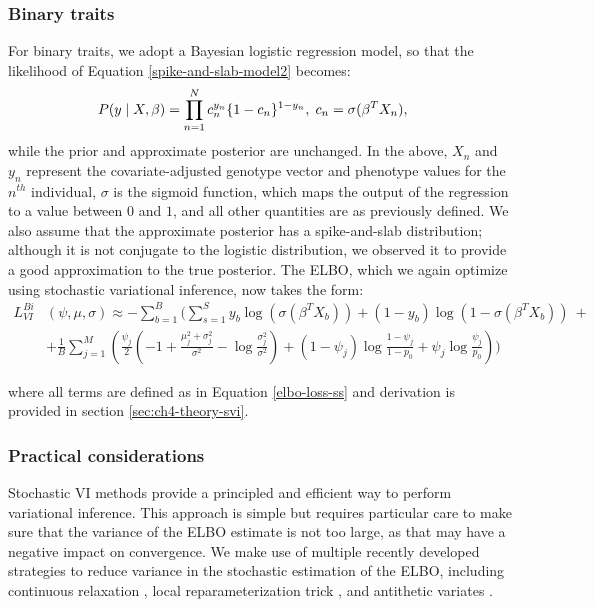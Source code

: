 \subsubsection{Binary traits}
%
For binary traits, we adopt a Bayesian logistic regression model, so that the likelihood of Equation \ref{spike-and-slab-model2} becomes:
\begin{align}
    P(y \mid X, \beta) &= \prod_{n=1}^{N} c_n^{y_n} \{1 - c_n\}^{1-y_n}, \hspace{1mm} c_n = \sigma(\beta^T X_n),
    \label{spike-and-slab-model3}
\end{align}
while the prior and approximate posterior are unchanged.
%
In the above, $X_n$ and $y_n$ represent the covariate-adjusted genotype vector and phenotype values for the $n^{th}$ individual, $\sigma$ is the sigmoid function, which maps the output of the regression to a value between $0$ and $1$, and all other quantities are as previously defined.
%
We also assume that the approximate posterior has a spike-and-slab distribution; although it is not conjugate to the logistic distribution, we observed it to provide a good approximation to the true posterior.
%
The ELBO, which we again optimize using stochastic variational inference, now takes the form: 
\begin{align}
    L^{Bi}_{VI}&(\psi, \mu, \sigma) \approx - \sum\limits^{B}_{b=1} \Bigg( \sum\limits^{S}_{s=1} y_b \log(\sigma(\beta^T X_b)) + (1-y_b)\log(1-\sigma(\beta^T X_b)) \nonumber \ + \\
    &+ \frac{1}{B}\sum\limits^{M}_{j=1} \left(  \frac{\psi_j}{2}\left(-1 + \frac{\mu_j^2 + \sigma_j^2}{\sigma^2} - \log \frac{\sigma_j^2}{\sigma^2} \right) + (1-\psi_j)\log\frac{1 - \psi_j}{1 - p_0} + \psi_j\log\frac{\psi_j}{p_0} \right) \Bigg)
\end{align}

where all terms are defined as in Equation \ref{elbo-loss-ss} and derivation is provided in section \ref{sec:ch4-theory-svi}.

\subsubsection{Practical considerations}
Stochastic VI methods provide a principled and efficient way to perform variational inference.
%
This approach is simple but requires particular care to make sure that the variance of the ELBO estimate is not too large, as that may have a negative impact on convergence.
%
We make use of multiple recently developed strategies to reduce variance in the stochastic estimation of the ELBO, including continuous relaxation \cite{maddison2016concrete,jang2016categorical}, local reparameterization trick \cite{kingma2015variational}, and antithetic variates \cite{hammersley1956new}.


